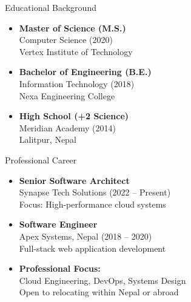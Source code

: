 \documentclass[11pt,a4paper]{article}
\begin{document}
\begin{minipage}[t]{0.48\textwidth}
  \vspace{0pt}
  \begin{sectionbox}{Educational Background}
    \begin{itemize}[leftmargin=*, label={\color{Gold}\faGraduationCap}]
      \item \textbf{Master of Science (M.S.)} \\
            Computer Science (2020) \\
            Vertex Institute of Technology
      \item \textbf{Bachelor of Engineering (B.E.)} \\
            Information Technology (2018) \\
            Nexa Engineering College
      \item \textbf{High School (+2 Science)} \\
            Meridian Academy (2014) \\
            Lalitpur, Nepal
    \end{itemize}
  \end{sectionbox}
\end{minipage}%
\hfill
\begin{minipage}[t]{0.48\textwidth}
  \vspace{0pt}
  \begin{sectionbox}{Professional Career}
    \begin{itemize}[leftmargin=*, label={\color{DeepRed}\faBriefcase}]
      \item \textbf{Senior Software Architect} \\
            Synapse Tech Solutions (2022 -- Present) \\
            Focus: High-performance cloud systems
      \item \textbf{Software Engineer} \\
            Apex Systems, Nepal (2018 -- 2020) \\
            Full-stack web application development
      \item \textbf{Professional Focus:} \\
            Cloud Engineering, DevOps, Systems Design \\
            Open to relocating within Nepal or abroad
    \end{itemize}
  \end{sectionbox}
\end{minipage}
\end{document}
